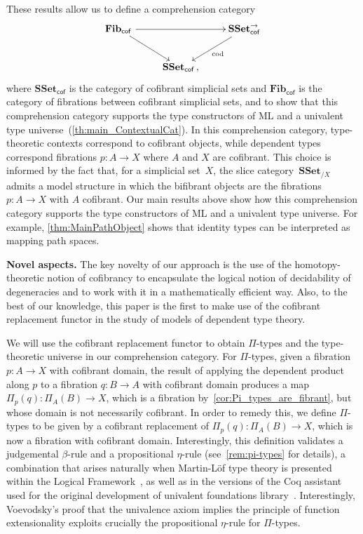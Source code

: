 \documentclass[reqno,10pt,a4paper,oneside,draft]{amsart}
\numberwithin{equation}{section}
\theoremstyle{mythm}
\theoremstyle{mydef}
\theoremstyle{myrmk}
\newcommand{\co}{\colon}
\newcommand{\SSet}{\mathbf{SSet}}
\begin{document}
These results allow us to define a comprehension category 
\begin{equation*}
\begin{gathered}
\xymatrix{
\mathbf{Fib}_{ \mathsf{cof}} \, \ar[dr] \ar[rr] & & \SSet^{\to}_{\mathsf{cof}} \ar[dl]^{\mathrm{cod}} \\ 
 & \SSet_{\mathsf{cof}} \, , &  }
 \end{gathered}
 \end{equation*}
 where $\SSet_{\mathsf{cof}}$ is the category of cofibrant simplicial sets and  $\mathbf{Fib}_{ \mathsf{cof}}$ is the category of fibrations between cofibrant simplicial
 sets, and to show that this comprehension category supports the type constructors of ML and a univalent type universe~(\cref{th:main_ContextualCat}). In this 
comprehension category, type-theoretic
contexts correspond to cofibrant objects, while dependent types correspond fibrations $p \co A \to X$ where 
 $A$ and $X$ are cofibrant. This choice is informed by the fact that, for a simplicial set~$X$, the slice category~$\mathbf{SSet}_{/X}$ admits a model structure in which the bifibrant objects are
 the fibrations $p \co A \to X$ with $A$ cofibrant. Our main results above show how this comprehension category  supports the type constructors of ML and a univalent type universe.
For example, \cref{thm:MainPathObject} shows that identity types can be interpreted as 
mapping path spaces. 

\smallskip

\noindent
\textbf{Novel aspects.} The key novelty of our approach is the use of the homotopy-theoretic notion of cofibrancy to encapsulate the logical notion of decidability of degeneracies and to work with it in a 
mathematically efficient way. Also, to the best of our knowledge, this paper is the first to make use of the cofibrant replacement functor in the study of models of dependent type theory.

We will use the cofibrant  replacement functor
to obtain $\Pi$-types and the type-theoretic universe in our comprehension category.  For $\Pi$-types, given a fibration $p \co A \to X$ with cofibrant domain, the result of applying the dependent product along $p$ to a fibration $q \co B \to A$ with cofibrant domain produces a map  $\Pi_p(q) \co \Pi_A(B) \to X$, which is a fibration by~\cref{cor:Pi_types_are_fibrant}, but whose domain
is not necessarily cofibrant. In order to remedy this, we define  $\Pi$-types to be given by a cofibrant replacement of
$\Pi_p(q) \co \Pi_A(B) \to X$, which is now a fibration with cofibrant domain. 
Interestingly, this definition validates
a judgemental $\beta$-rule and a propositional $\eta$-rule (see~\cref{rem:pi-types} for details), a combination that arises naturally when  Martin-L\"of type theory is presented
within the Logical Framework~\cite{nordstrom-petersson-smith:ml,GarnerR:strdp}, as well as in
the versions of the Coq assistant used for the original development of  univalent foundations
library~\cite{voevodsky:library}. Interestingly, Voevodsky's proof that the univalence axiom implies the principle of function extensionality exploits crucially the propositional $\eta$-rule for $\Pi$-types. 
\end{document}
